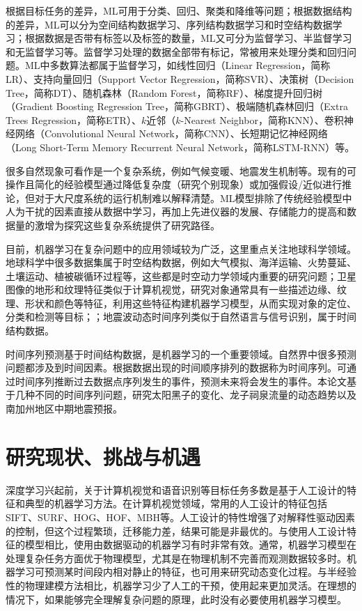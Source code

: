 根据目标任务的差异，ML可用于分类、回归、聚类和降维等问题；根据数据结构的差异，ML可以分为空间结构数据学习、序列结构数据学习和时空结构数据学习；根据数据是否带有标签以及标签的数量，ML又可分为监督学习、半监督学习和无监督学习等。监督学习处理的数据全部带有标记，常被用来处理分类和回归问题。ML中多数算法都属于监督学习，如线性回归（Linear Regression，简称LR）、支持向量回归（Support Vector Regression，简称SVR）、决策树（Decision Tree，简称DT）、随机森林（Random Forest，简称RF）、梯度提升回归树（Gradient Boosting Regression Tree，简称GBRT）、极端随机森林回归（Extra Trees Regression，简称ETR）、$k$近邻（$k$-Nearest Neighbor，简称KNN）、卷积神经网络（Convolutional Neural Network，简称CNN）、长短期记忆神经网络（Long Short-Term Memory Recurrent Neural Network，简称LSTM-RNN）等。

很多自然现象可看作是一个复杂系统，例如气候变暖、地震发生机制等\citep{fan2021statistical}。现有的可操作且简化的经验模型通过降低复杂度（研究个别现象）或加强假设/近似进行推论，但对于大尺度系统的运行机制难以解释清楚。ML模型排除了传统经验模型中人为干扰的因素直接从数据中学习，再加上先进仪器的发展、存储能力的提高和数据量的激增为探究这些复杂系统提供了研究路径。

目前，机器学习在复杂问题中的应用领域较为广泛，这里重点关注地球科学领域。地球科学中很多数据集属于时空结构数据，例如大气模拟、海洋运输、火势蔓延、土壤运动、植被碳循环过程等，这些都是时空动力学领域内重要的研究问题\citep{mathieu2015deep,oh2015action}；卫星图像的地形和纹理特征类似于计算机视觉，研究对象通常具有一些描述边缘、纹理、形状和颜色等特征，利用这些特征构建机器学习模型，从而实现对象的定位、分类和检测等目标\citep{lee1990neural}；；地震波动态时间序列类似于自然语言与信号识别，属于时间结构数据\citep{rouet2017machine,perol2018convolutional,devries2018deep}。

时间序列预测基于时间结构数据，是机器学习的一个重要领域。自然界中很多预测问题都涉及到时间因素。根据数据出现的时间顺序排列的数据称为时间序列。可通过时间序列推断过去数据点序列发生的事件，预测未来将会发生的事件。本论文基于几种不同的时间序列问题，研究太阳黑子的变化、龙子祠泉流量的动态趋势以及南加州地区中期地震预报。

\section{研究现状、挑战与机遇}\label{sec:intro_veiw}

深度学习兴起前，关于计算机视觉和语音识别等目标任务多数是基于人工设计的特征和典型的机器学习方法。在计算机视觉领域，常用的人工设计的特征包括SIFT、SURF、HOG、HOF、MBH等。人工设计的特性增强了对解释性驱动因素的控制，但这个过程繁琐，迁移能力差，结果可能是非最优的。与使用人工设计特征的模型相比，使用由数据驱动的机器学习有时非常有效。通常，机器学习模型在处理复杂任务方面优于物理模型，尤其是在物理机制不完善而观测数据较多时。机器学习可预测某时间段内相对静止的特征，也可用来研究动态变化过程。与半经验性的物理建模方法相比，机器学习少了人工的干预，使用起来更加灵活。在理想的情况下，如果能够完全理解复杂问题的原理，此时没有必要使用机器学习模型。

